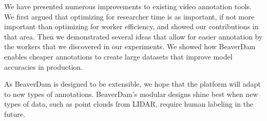 We have presented numerous improvements to existing video annotation tools.
We first argued that optimizing for researcher time is as important, if not more important than optimizing for worker efficiency, and showed our contributions in that area.
Then we demonstrated several ideas that allow for easier annotation by the workers that we discovered in our experiments.
We showed how BeaverDam enables cheaper annotations to create large datasets that improve model accuracies in production.

As BeaverDam is designed to be extensible, we hope that the platform will adapt to new types of annotations.
BeaverDam's modular designs shine best when new types of data, such as point clouds from LIDAR, require human labeling in the future.


